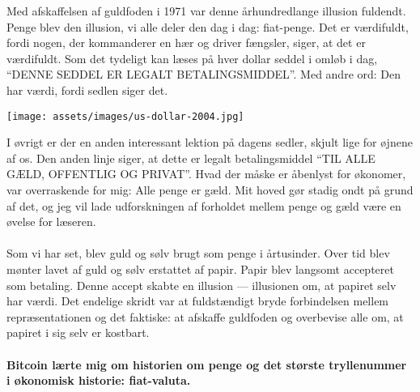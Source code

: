 Med afskaffelsen af guldfoden i 1971 var denne århundredlange
illusion fuldendt. Penge blev den illusion, vi alle deler den dag i dag: 
fiat-penge. Det er værdifuldt, fordi nogen, der kommanderer en hær og driver 
fængsler, siger, at det er værdifuldt. Som det tydeligt kan læses på hver 
dollar seddel i omløb i dag, \enquote{DENNE SEDDEL ER LEGALT BETALINGSMIDDEL}. 
Med andre ord: Den har værdi, fordi sedlen siger det.

\begin{center}
  \centering
  \texttt{[image: assets/images/us-dollar-2004.jpg]}
  \label{fig:us-dollar-2004}
\end{center}
  
I øvrigt er der en anden interessant lektion på dagens sedler,
skjult lige for øjnene af os. Den anden linje siger, at dette er legalt 
betalingsmiddel \enquote{TIL ALLE GÆLD, OFFENTLIG OG PRIVAT}. Hvad der måske 
er åbenlyst for økonomer, var overraskende for mig: Alle penge er gæld. Mit 
hoved gør stadig ondt på grund af det, og jeg vil lade udforskningen af 
forholdet mellem penge og gæld være en øvelse for læseren.

\paragraph{}
Som vi har set, blev guld og sølv brugt som penge i årtusinder. Over tid
blev mønter lavet af guld og sølv erstattet af papir. Papir
blev langsomt accepteret som betaling. Denne accept skabte en
illusion --- illusionen om, at papiret selv har værdi. Det endelige
skridt var at fuldstændigt bryde forbindelsen mellem repræsentationen og
det faktiske: at afskaffe guldfoden og overbevise alle om, at
papiret i sig selv er kostbart.

\paragraph{Bitcoin lærte mig om historien om penge og det største tryllenummer
i økonomisk historie: fiat-valuta.}

%
%
%
%

